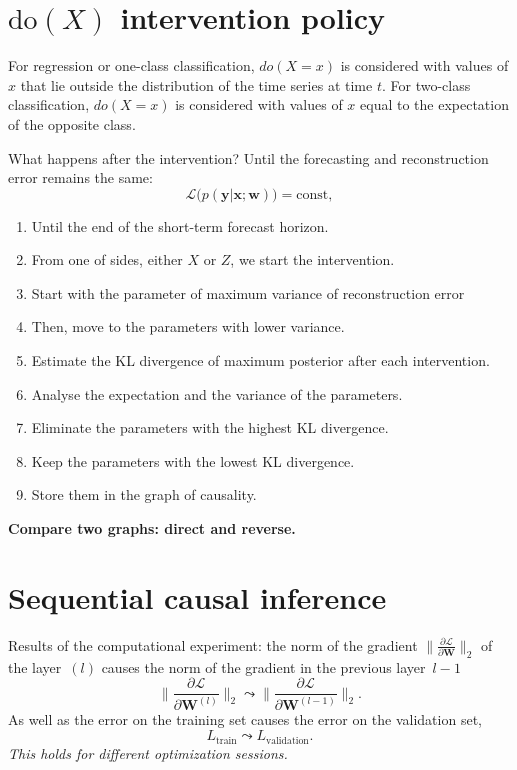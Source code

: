 \documentclass[12pt]{article}
\newcommand{\eL}{\mathcal{L}}
\newcommand{\doc}{\mathrm{do}}
\newcommand{\bW}{\mathbf{W}}
\begin{document}
\section{$\doc(X)$ intervention policy}
For regression or one-class classification, $do(X = x)$ is considered with values of $x$ that lie outside the distribution of the time series at time $t$.
For two-class classification, $do(X = x)$ is considered with values of $x$ equal to the expectation of the opposite class.

What happens after the intervention?
Until the forecasting and reconstruction error remains the same:
\[
    \eL\bigl(p(\mathbf{y}|\mathbf{x}; \mathbf{w})\bigr) = \text{const},
\]
\begin{enumerate}
    \item Until the end of the short-term forecast horizon.
    \item From one of sides, either $X$ or $Z$, we start the intervention.
    \item Start with the parameter of maximum variance of reconstruction error
    \item Then, move to the parameters with lower variance.
    \item Estimate the KL divergence of maximum posterior after each intervention.
    \item Analyse the expectation and the variance of the parameters.
    \item Eliminate the parameters with the highest KL divergence.
    \item Keep the parameters with the lowest KL divergence.
    \item Store them in the graph of causality.
\end{enumerate}
    {\bf{Compare two graphs: direct and reverse.}}

\section{Sequential causal inference}
Results of the computational experiment: the norm of the gradient
$\|\frac{\partial \eL}{\partial \bW}\|_2$
of the layer~$(l)$ causes the norm of the gradient in the previous layer~$l-1$
\[
    \Big\|\frac{\partial \eL}{\partial \bW^{(l)}}\Big\|_2 \leadsto \Big\|\frac{\partial \eL}{\partial \bW^{(l-1)}}\Big\|_2.
\]
As well as the error on the training set causes the error on the validation set,
\[
    L_\text{train} \leadsto L_\text{validation}.
\]
\emph{This holds for different optimization sessions.}
\end{document}
